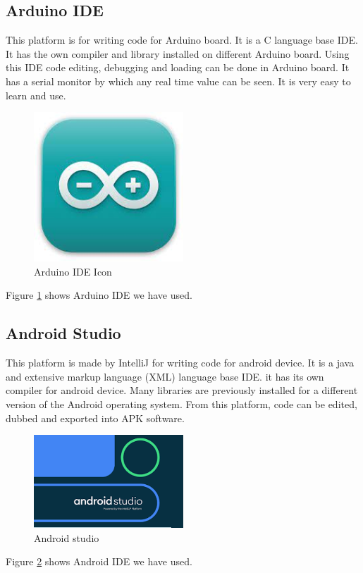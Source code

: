 \subsection{Arduino IDE}
This platform is for writing code for Arduino board. It is a C language base IDE. It has the own compiler and library installed on different Arduino board. Using this IDE code editing, debugging and loading can be done in Arduino board. It has a serial monitor by which any real time value can be seen. It is very easy to learn and use.
\begin{figure}[h]
\centering
\includegraphics[width=0.5\textwidth]{figures/arduino_ide.jpg}
\caption{Arduino IDE Icon}
\label{Arduino1}
\end{figure}
Figure \ref{Arduino1} shows Arduino IDE  we have used.
\pagebreak
\subsection{Android Studio}
This platform is made by IntelliJ for writing code for android device. It is a java and extensive markup language (XML) language base IDE. it has its own compiler for android device. Many libraries are previously installed for a different version of the Android operating system. From this platform, code can be edited, dubbed and exported into APK software.
\begin{figure}[h]
\centering
\includegraphics[width=0.5\textwidth]{figures/android_studio.png}
\caption{Android studio}
\label{Android1}
\end{figure}
Figure \ref{Android1} shows Android IDE  we have used.

